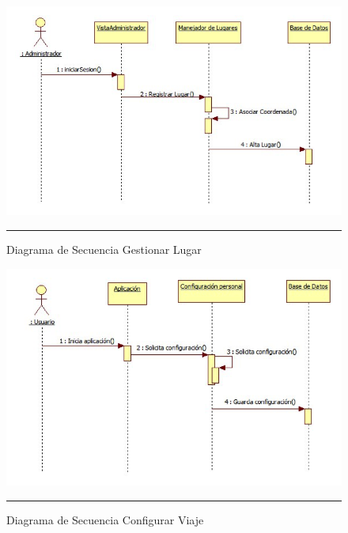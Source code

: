 \begin{figure}[H]
	\centering
		\includegraphics[width=1\textwidth]{Figuras/secGestionarLugar.png}
		\rule{30em}{0.5pt}
	\caption[Diagrama de Secuencia Gestionar Lugar]{Diagrama de Secuencia Gestionar Lugar}
	\label{fig:secGestionarLugar}
\end{figure}

\begin{figure}[H]
	\centering
		\includegraphics[width=1\textwidth]{Figuras/secConfigurarViaje.png}
		\rule{30em}{0.5pt}
	\caption[Diagrama de Secuencia Configurar Viaje]{Diagrama de Secuencia Configurar Viaje}
	\label{fig:secConfigurarViaje}
\end{figure}

